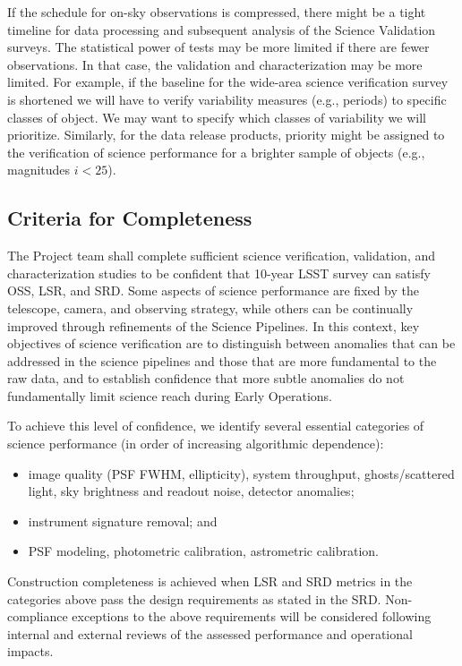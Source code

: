 If the schedule for on-sky observations is compressed, there might be a tight timeline for data processing and subsequent analysis of the Science Validation surveys. The statistical power of tests may be more limited if there are fewer observations. In that case, the validation and characterization may be more limited. For example, if the baseline for the wide-area science verification survey is shortened we will have to verify variability measures (e.g., periods) to specific classes of object. We may want to specify which classes of variability we will prioritize. Similarly, for the data release products, priority might be assigned to the verification of science performance for a brighter sample of objects (e.g., magnitudes $i < 25$).

\subsection{Criteria for Completeness}
The Project team shall complete sufficient science verification, validation, and characterization studies to be confident that 10-year LSST survey can satisfy OSS, LSR, and SRD. Some aspects of science performance are fixed by the telescope, camera, and observing strategy, while others can be continually improved through refinements of the Science Pipelines. In this context, key objectives of science verification are to distinguish between anomalies that can be addressed in the science pipelines and those that are more fundamental to the raw data, and to establish confidence that more subtle anomalies do not fundamentally limit science reach during Early Operations.

To achieve this level of confidence, we identify several essential categories of science performance (in order of increasing algorithmic dependence):

\begin{itemize}
	\item image quality (PSF FWHM, ellipticity), system throughput, ghosts/scattered light, sky brightness and readout noise, detector anomalies;
	\item instrument signature removal; and
	\item PSF modeling, photometric calibration, astrometric calibration.
\end{itemize}

Construction completeness is achieved when LSR and SRD metrics in the categories above pass the design requirements as stated in the SRD. Non-compliance exceptions to the above requirements will be considered following internal and external reviews of the assessed performance and operational impacts.

